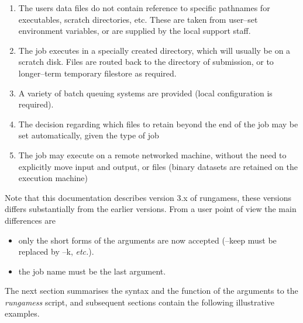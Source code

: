 \documentclass[11pt,fleqn]{article}
\begin{document}
\begin{enumerate}
\item The users data files do not contain reference to specific
pathnames for executables, scratch directories, etc. These are taken
from user--set environment variables, or are supplied by the
local support staff. 
\item The job executes in a specially created directory, which will usually
be on a scratch disk. Files are routed back to the directory of submission,
or to longer--term temporary filestore as required.
\item A variety of batch queuing systems are provided (local configuration
is required).
\item The decision regarding which files to retain beyond the end of 
the job may be set automatically, given the type of job
\item The job may execute on a remote networked machine, without
the need to explicitly move input and output, or files  (binary datasets
are retained on the execution machine)
\end{enumerate}

Note that this documentation describes version 3.x of rungamess, these
versions differs substantially from the earlier versions. From a user 
point of view the main differences are

\begin{itemize} 
\item only the short forms of the arguments are now accepted (--keep must
      be replaced by --k, {\em etc.}).
\item  the job name must be the last argument.
\end{itemize}


The next section summarises the syntax and the function of the arguments
to the {\em rungamess} script, and subsequent sections contain the following
illustrative examples.
\end{document}
